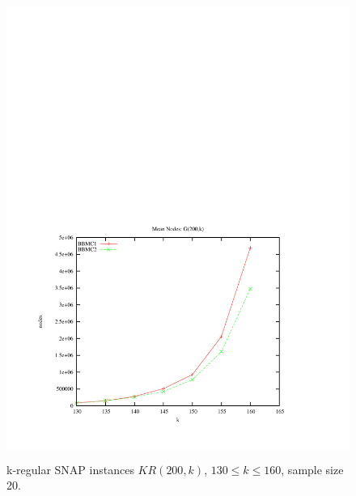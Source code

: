 \documentclass{l4proj}
\begin{document}
\begin{figure}
\vspace{-7cm}
\begin{center}
\includegraphics[height=15.0cm]{bbmc-regular-200.pdf}
\end{center}
\vspace{-1cm}
\caption{k-regular SNAP instances $KR(200,k)$, $130\leq k \leq 160$, sample size 20.}
\label{bbmc-regular-200}
\end{figure}
\end{document}
